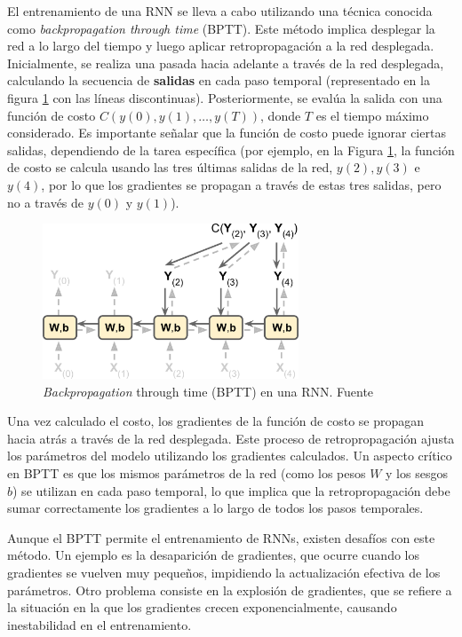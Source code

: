 El entrenamiento de una RNN se lleva a cabo utilizando una técnica conocida como \textit{backpropagation through time} (BPTT). Este método implica desplegar la red a lo largo del tiempo y luego aplicar retropropagación a la red desplegada. Inicialmente, se realiza una pasada hacia adelante a través de la red desplegada, calculando la secuencia de \textbf{salidas} en cada paso temporal (representado en la figura \ref{fig:bptt} con las líneas discontinuas). Posteriormente, se evalúa la salida con una función de costo \( C(y(0), y(1), \ldots, y(T)) \), donde \( T \) es el tiempo máximo considerado. Es importante señalar que la función de costo puede ignorar ciertas salidas, dependiendo de la tarea específica (por ejemplo, en la Figura \ref{fig:bptt}, la función de costo se calcula usando las tres últimas salidas de la red, \( y(2), y(3) \) e \( y(4) \), por lo que los gradientes se propagan a través de estas tres salidas, pero no a través de \( y(0) \) y \( y(1) \)). 

\begin{figure}[h]
    \centering
    \includegraphics[width=0.68\textwidth]{img/bptt.png}
    \caption{\textit{Backpropagation} through time (BPTT) en una RNN. Fuente \citep{geron2022hands}}
    \label{fig:bptt}
\end{figure}

Una vez calculado el costo, los gradientes de la función de costo se propagan hacia atrás a través de la red desplegada. Este proceso de retropropagación ajusta los parámetros del modelo utilizando los gradientes calculados. Un aspecto crítico en BPTT es que los mismos parámetros de la red (como los pesos \( W \) y los sesgos \( b \)) se utilizan en cada paso temporal, lo que implica que la retropropagación debe sumar correctamente los gradientes a lo largo de todos los pasos temporales.

Aunque el BPTT permite el entrenamiento de RNNs, existen desafíos con este método. Un ejemplo es la desaparición de gradientes, que ocurre cuando los gradientes se vuelven muy pequeños, impidiendo la actualización efectiva de los parámetros. Otro problema consiste en la explosión de gradientes, que se refiere a la situación en la que los gradientes crecen exponencialmente, causando inestabilidad en el entrenamiento.

